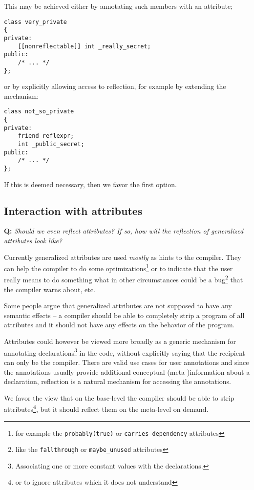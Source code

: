 This may be achieved either by annotating such members with an attribute;

\begin{verbatim}
class very_private
{
private:
	[[nonreflectable]] int _really_secret;
public:
	/* ... */
};
\end{verbatim}

or by explicitly allowing access to reflection, for example by extending
the \verb@friend@ mechanism:

\begin{verbatim}
class not_so_private
{
private:
	friend reflexpr;
	int _public_secret;
public:
	/* ... */
};
\end{verbatim}

If this is deemed necessary, then we favor the first option.

\subsection{Interaction with attributes}

\textbf{Q:} {\em Should we even reflect attributes? If so, how will the reflection
of generalized attributes look like?}

Currently generalized attributes are used {\em mostly} as hints to the compiler.
They can help the compiler to do some optimizations\footnote{for example the
\texttt{probably(true)} or \texttt{carries\_dependency} attributes} or to
indicate that the user really means to do something what in other circumstances
could be a bug\footnote{like the \texttt{fallthrough} or \texttt{maybe\_unused}
attributes} that the compiler warns about, etc.

Some people argue that generalized attributes are not supposed to have any
semantic effects -- a compiler should be able to completely strip 
a program of all attributes and it should not have any effects on the behavior
of the program.

Attributes could however be viewed more broadly as a generic mechanism for
annotating declarations\footnote{Associating one or more constant values with
the declarations.} in the code, without explicitly saying that the recipient
can only be the compiler.
There are valid use cases for user annotations and since the annotations
usually provide additional conceptual (meta-)information about a declaration,
reflection is a natural mechanism for accessing the annotations.

We favor the view that on the base-level the compiler should be able to
strip attributes\footnote{or to ignore attributes which it does not understand},
but it should reflect them on the meta-level on demand.

